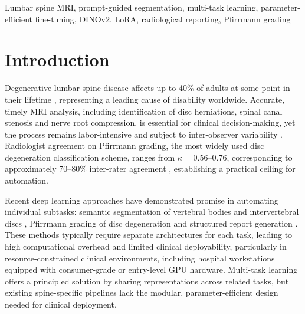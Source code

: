 \documentclass[journal]{IEEEtran}
\begin{document}
\begin{IEEEkeywords}
Lumbar spine MRI, prompt-guided segmentation, multi-task learning, parameter-efficient fine-tuning, DINOv2, LoRA, radiological reporting, Pfirrmann grading
\end{IEEEkeywords}

\section{Introduction}
\label{sec:introduction}

Degenerative lumbar spine disease affects up to 40\% of adults at some point in their lifetime \cite{hoy2010epidemiology}, representing a leading cause of disability worldwide. Accurate, timely MRI analysis, including identification of disc herniations, spinal canal stenosis and nerve root compression, is essential for clinical decision-making, yet the process remains labor-intensive and subject to inter-observer variability \cite{lurie2016management}. Radiologist agreement on Pfirrmann grading, the most widely used disc degeneration classification scheme, ranges from $\kappa = 0.56$--$0.76$, corresponding to approximately 70--80\% inter-rater agreement \cite{wilke2006discdegeneration}, establishing a practical ceiling for automation.

Recent deep learning approaches have demonstrated promise in automating individual subtasks: semantic segmentation of vertebral bodies and intervertebral discs \cite{pang2021spineparsenet, chen2021transunet}, Pfirrmann grading of disc degeneration \cite{jamaludin2017spinenet} and structured report generation \cite{jing2019show}. These methods typically require separate architectures for each task, leading to high computational overhead and limited clinical deployability, particularly in resource-constrained clinical environments, including hospital workstations equipped with consumer-grade or entry-level GPU hardware. Multi-task learning \cite{caruana1997multitask} offers a principled solution by sharing representations across related tasks, but existing spine-specific pipelines lack the modular, parameter-efficient design needed for clinical deployment.
\end{document}
